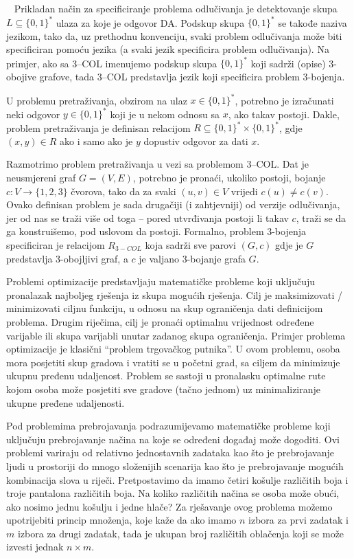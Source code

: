 ~ Prikladan način za specificiranje problema odlučivanja je detektovanje skupa $L \subseteq \{0, 1\}^*$ ulaza za koje je odgovor DA. Podskup skupa $\{0, 1\}^*$ se takođe naziva jezikom, tako da, uz prethodnu konvenciju, svaki problem odlučivanja može biti specificiran pomoću jezika (a svaki jezik specificira problem odlučivanja). Na primjer, ako sa   3--COL imenujemo podskup skupa $\{0, 1\}^*$ koji sadrži (opise) 3-obojive grafove, tada 3--COL predstavlja jezik koji specificira problem 3-bojenja. %

U problemu pretraživanja, obzirom na ulaz $x \in \{0, 1\}^*$, potrebno je izračunati neki odgovor
$y \in  \{0, 1\}^*$ koji je u nekom odnosu sa $x$, ako takav  postoji. Dakle, problem pretraživanja je
definisan relacijom $R \subseteq \{0, 1\}^* \times \{0, 1\}^*$, gdje $(x, y) \in R$ ako i samo ako je $y$ dopustiv odgovor  za dati $x$. 

Razmotrimo problem pretraživanja  u vezi sa problemom 3--COL. Dat je
neusmjereni graf $G = (V, E)$, potrebno je pronaći, ukoliko postoji, bojanje $c \colon V \rightarrow \{1, 2, 3\}$
čvorova, tako da za svaki $(u, v) \in V$ vrijedi $c(u) \neq c(v)$. Ovako definisan problem je sada drugačiji (i zahtjevniji) od verzije odlučivanja, jer  od nas se traži  više od toga  --  pored
utvrđivanja postoji li takav $c$, traži se da ga konstruišemo, pod uslovom da postoji.
Formalno, problem 3-bojenja specificiran je relacijom $R_{3-COL}$ koja sadrži sve
parovi $(G, c)$ gdje je $G$ predstavlja 3-obojljivi graf, a $c$ je valjano 3-bojanje grafa $G$.

Problemi optimizacije predstavljaju matematičke probleme koji uključuju pronalazak najboljeg rješenja iz skupa mogućih rješenja. Cilj je maksimizovati / minimizovati   ciljnu funkciju, u odnosu na skup  ograničenja dati definicijom problema. Drugim riječima, cilj je pronaći optimalnu vrijednost određene varijable ili skupa varijabli unutar zadanog skupa ograničenja. Primjer problema optimizacije je klasični ``problem trgovačkog putnika''. U ovom problemu, osoba mora posjetiti skup gradova i vratiti se u   početni grad, sa ciljem da minimizuje ukupnu pređenu udaljenost. Problem se sastoji u pronalasku optimalne rute kojom osoba može posjetiti sve gradove (tačno jednom) uz minimaliziranje ukupne pređene udaljenosti.

Pod problemima prebrojavanja podrazumijevamo matematičke probleme koji uključuju prebrojavanje načina na koje se određeni događaj može dogoditi. Ovi problemi variraju od relativno jednostavnih zadataka kao što je prebrojavanje ljudi u prostoriji do mnogo složenijih scenarija kao što je prebrojavanje    mogućih kombinacija slova u riječi. Pretpostavimo da imamo četiri košulje različitih boja i troje pantalona različitih boja. Na koliko različitih načina se osoba može obući, ako nosimo jednu košulju i jedne hlače?  Za rješavanje ovog problema možemo upotrijebiti princip množenja, koje kaže da ako imamo $ n$ izbora za prvi zadatak i $m$ izbora za drugi zadatak, tada je ukupan broj različitih oblačenja koji se može izvesti jednak  $n \times m$.

